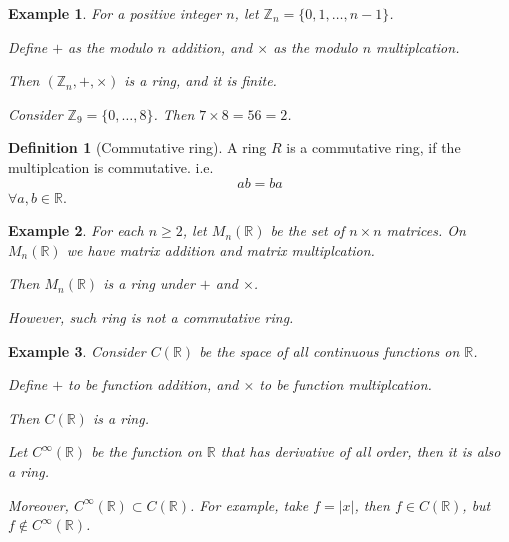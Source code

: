\documentclass{article}
\theoremstyle{MyNonumberplain}
\theoremstyle{break}
\newcommand{\nin}{\not\in}
\theoremstyle{break}
\newtheorem{example}{Example}[section]
\theoremstyle{break}
\theoremstyle{definition}
\theoremstyle{break}
\newtheorem{definition}{Definition}[section]
\begin{document}
\begin{expbox}
    \begin{example}
        For a positive integer $n$, let $\mathbb{Z}_n = \{ 0, 1, \ldots, n - 1 \}$.\bigskip

        Define $+$ as the modulo $n$ addition, and $\times$ as the modulo $n$
        multiplcation.\bigskip

        Then $(\mathbb{Z}_n, +, \times)$ is a ring, and it is finite.\bigskip 

        Consider $\mathbb{Z}_9 = \{ 0, \ldots, 8 \}$. Then $7 \times 8 = 56 = 2$.
    \end{example}
\end{expbox}

\begin{defbox}
    \begin{definition}[Commutative ring]
        A ring $R$ is a commutative ring, if the multiplcation is commutative. i.e.
        \[ a b = b a \]
        $\forall a, b \in \mathbb{R}$.
    \end{definition}
\end{defbox}

\begin{expbox}
    \begin{example}
        For each $n \geq 2$, let $M_n (\mathbb{R})$ be the set of $n \times n$
        matrices. On $M_n (\mathbb{R})$ we have matrix addition and matrix
        multiplcation.\bigskip
        
        Then $M_n (\mathbb{R})$ is a ring under $+$ and $\times$.\bigskip
        
        However, such ring is not a commutative ring.
    \end{example}
\end{expbox}

\begin{expbox}
    \begin{example}
        Consider $C (\mathbb{R})$ be the space of all continuous functions on
        $\mathbb{R}$.\bigskip
        
        Define $+$ to be function addition, and $\times$ to be function multiplcation.\bigskip
        
        Then $C (\mathbb{R})$ is a ring.\bigskip
        
        Let $C^{\infty} (\mathbb{R})$ be the function on $\mathbb{R}$ that has
        derivative of all order, then it is also a ring.\bigskip
        
        Moreover, $C^{\infty} (\mathbb{R}) \subset C (\mathbb{R})$. For example, take
        $f = | x |$, then $f \in C (\mathbb{R})$, but $f \nin C^{\infty}
        (\mathbb{R})$.
    \end{example}
\end{expbox}
\end{document}
